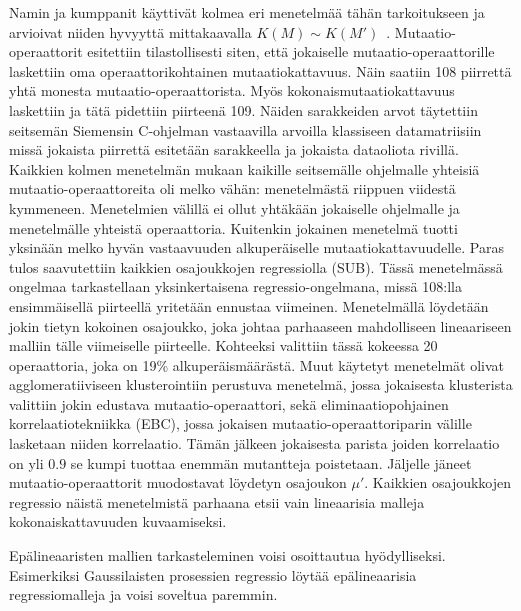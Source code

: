 \documentclass[finnish]{tktltiki2}
\begin{document}
Namin ja kumppanit käyttivät kolmea eri menetelmää tähän tarkoitukseen ja arvioivat niiden hyvyyttä mittakaavalla $K(M) \sim K(M')$~\cite{NaminA06}. Mu\-taa\-tio\--ope\-raatto\-rit esitettiin tilastollisesti siten, että jokaiselle mutaatio\--ope\-raattori\-lle laskettiin oma operaattorikohtainen mutaatiokattavuus. Näin saatiin 108 piirrettä yhtä monesta mu\-taa\-tio\--ope\-raatto\-rista. Myös kokonaismutaatiokattavuus laskettiin ja tätä pidettiin piirteenä 109. Näiden sarakkeiden arvot täytettiin seitsemän Siemensin C-ohjelman vastaavilla arvoilla klassiseen datamatriisiin missä jokaista piirrettä esitetään sarakkeella ja jokaista dataoliota rivillä. Kaikkien kolmen menetelmän mukaan kaikille seitsemälle ohjelmalle yhteisiä mu\-taa\-tio\--ope\-raatto\-reita oli melko vähän: menetelmästä riippuen viidestä kymmeneen. Menetelmien välillä ei ollut yhtäkään jokaiselle ohjelmalle ja menetelmälle yhteistä operaattoria. Kuitenkin jokainen menetelmä tuotti yksinään melko hyvän vastaavuuden alkuperäiselle mutaatiokattavuudelle. Paras tulos saavutettiin kaikkien osajoukkojen regressiolla (SUB). Tässä menetelmässä ongelmaa tarkastellaan yksinkertaisena regressio-ongelmana, missä 108:lla ensimmäisellä piirteellä yritetään ennustaa viimeinen. Menetelmällä löydetään jokin tietyn kokoinen osajoukko, joka johtaa parhaaseen mahdolliseen lineaariseen malliin tälle viimeiselle piirteelle. Kohteeksi valittiin tässä kokeessa 20 operaattoria, joka on 19\% alkuperäismäärästä. Muut käytetyt menetelmät olivat agglomeratiiviseen klusterointiin perustuva menetelmä, jossa jokaisesta klusterista valittiin jokin edustava mu\-taa\-tio\--ope\-raatto\-ri, sekä eliminaatiopohjainen korrelaatiotekniikka (EBC), jossa jokaisen mu\-taa\-tio\--ope\-raattori\-parin välille lasketaan niiden korrelaatio. Tämän jälkeen jokaisesta parista joiden korrelaatio on yli $0.9$ se kumpi tuottaa enemmän mutantteja poistetaan. Jäljelle jäneet mu\-taa\-tio\--ope\-raatto\-rit muodostavat löydetyn osajoukon $\mu'$. Kaikkien osajoukkojen regressio näistä menetelmistä parhaana etsii vain lineaarisia malleja kokonaiskattavuuden kuvaamiseksi. 

Epälineaaristen mallien tarkasteleminen voisi osoittautua hyödylliseksi. Esimerkiksi Gaussilaisten prosessien regressio löytää epälineaarisia regressiomalleja ja voisi soveltua paremmin.
\end{document}
